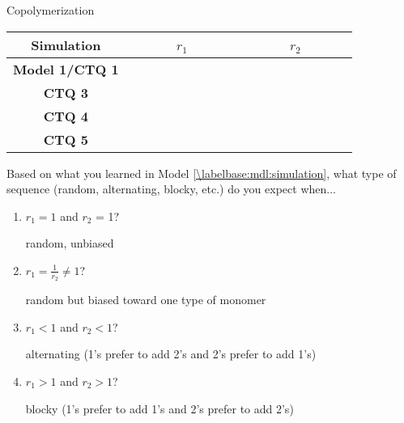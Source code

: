 \begin{activity}{Copolymerization}
\begin{ctqs}
		\begin{center}
		\renewcommand{\arraystretch}{2.5}
		\begin{tabular}{|c|c|c|}
			\hline
			\textbf{Simulation} & ~~~~~~$r_1$~~~~~~ & ~~~~~~$r_2$~~~~~~ \\\hline
			\textbf{Model 1/CTQ 1} & \answer{$\frac{0.5}{0.5}=1$} & \answer{$\frac{0.5}{0.5}=1$} \\\hline
			\textbf{CTQ 3} & \answer{$\frac{0.2}{0.8}=0.25$} & \answer{$\frac{0.2}{0.8}=0.25$} \\\hline
			\textbf{CTQ 4} & \answer{$\frac{0.8}{0.2}=4$} & \answer{$\frac{0.8}{0.2}=4$} \\\hline
			\textbf{CTQ 5} & \answer{$\frac{0.2}{0.8}=0.25$} & \answer{$\frac{0.8}{0.2}=4$} \\\hline
		\end{tabular}
		\end{center}

	\question Based on what you learned in Model \ref{\labelbase:mdl:simulation}, what type of sequence (random, alternating, blocky, etc.) do you expect when...
	
		\begin{enumerate}
			\item $r_1 = 1$ and $r_2$ = 1?
			
				\begin{solution}[0.5in]
					random, unbiased
				\end{solution}
			
			\item $r_1 = \frac{1}{r_2} \neq 1$?
			
				\begin{solution}[0.5in]
					random but biased toward one type of monomer
				\end{solution}
			
			\item $r_1 < 1$ and $r_2 < 1$?
			
				\begin{solution}[0.5in]
					alternating (1's prefer to add 2's and 2's prefer to add 1's)
				\end{solution}
			
			\item $r_1 > 1$ and $r_2 > 1$?
			
				\begin{solution}[0.5in]
					blocky (1's prefer to add 1's and 2's prefer to add 2's)
				\end{solution}
		\end{enumerate}


\end{ctqs}
\end{activity}
